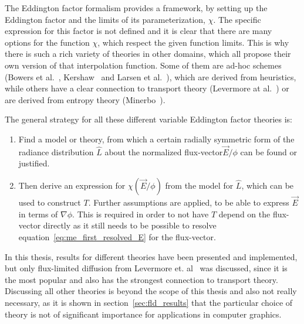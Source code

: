 The Eddington factor formalism provides a framework, by setting up the Eddington factor and the limits of its parameterization, $\chi$. The specific expression for this factor is not defined and it is clear that there are many options for the function $\chi$, which respect the given function limits. This is why there is such a rich variety of theories in other domains, which all propose their own version of that interpolation function. Some of them are ad-hoc schemes (Bowers et al.~\cite{Bowers82}, Kershaw~\cite{Kershaw76} and Larsen et al.~\cite{Larsen74}), which are derived from heuristics, while others have a clear connection to transport theory (Levermore at al.~\cite{Levermore81}) or are derived from entropy theory (Minerbo~\cite{Minerbo78}).

The general strategy for all these different variable Eddington factor theories is:
\begin{enumerate}
\item Find a model or theory, from which a certain radially symmetric form of the radiance distribution $\hat{L}$ about the normalized flux-vector$\vec{E}/\phi$ can be found or justified.
\item Then derive an expression for $\chi(\vec{E}/\phi)$ from the model for $\hat{L}$, which can be used to construct $T$. Further assumptions are applied, to be able to express $\vec{E}$ in terms of $\nabla\phi$. This is required in order to not have $T$ depend on the flux-vector directly as it still needs to be possible to resolve equation~\ref{eq:me_first_resolved_E} for the flux-vector.
\end{enumerate}

In this thesis, results for different theories have been presented and implemented, but only flux-limited diffusion from Levermore et. al~\cite{Levermore81} was discussed, since it is the most popular and also has the strongest connection to transport theory. Discussing all other theories is beyond the scope of this thesis and also not really necessary, as it is shown in section~\ref{sec:fld_results} that the particular choice of theory is not of significant importance for applications in computer graphics.